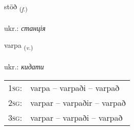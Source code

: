 \documentclass[frontgrid, backgrid]{flacards}\usepackage[]{graphicx}\usepackage[]{xcolor}
\begin{document}
\renewcommand{\blhead}{\vskip5pt {\small\bfseries\footnotesize Nafnorð | іменник }}
\renewcommand{\bcfoot}{\vskip5pt \hspace{2pt}{\small\bfseries\footnotesize 2K}}


{stöð \small{\textsubscript{(\textit{f.})}} \\[1ex] %
\textphonetic{[stœːð]} \\
ukr.: \emph{станція} \\  [2ex]
\renewcommand*{\arraystretch}{0.8}
}

\renewcommand{\flhead}{\vskip5pt \fboxsep=0pt {\small\bfseries\footnotesize Sagnorð | дієслово}}
\renewcommand{\fcfoot}{\vskip5pt \fboxsep=0pt \hspace{2pt}{\small\bfseries\footnotesize 2K}}

\renewcommand{\blhead}{\vskip5pt {\small\bfseries\footnotesize Sagnorð | дієслово }}
\renewcommand{\bcfoot}{\vskip5pt \hspace{2pt}{\small\bfseries\footnotesize 2K}}


{varpa \small{\textsubscript{(\textit{v.})}} \\[1ex] %
\textphonetic{[var̥pa]} \\
ukr.: \emph{кидати} \\  [2ex]
\renewcommand*{\arraystretch}{0.8}
\begin{tabular}{p{1cm}l}
\textsc{1sg}: & varpa -- varpaði -- varpað \\ 
\textsc{2sg}: & varpar -- varpaðir -- varpað \\ 
\textsc{3sg}: & varpar -- varpaði -- varpað \\ 
\end{tabular}
}

\renewcommand{\flhead}{\vskip5pt \fboxsep=0pt {\small\bfseries\footnotesize Lýsingarorð | прикметник}}
\renewcommand{\fcfoot}{\vskip5pt \fboxsep=0pt \hspace{2pt}{\small\bfseries\footnotesize 2K}}
\end{document}
